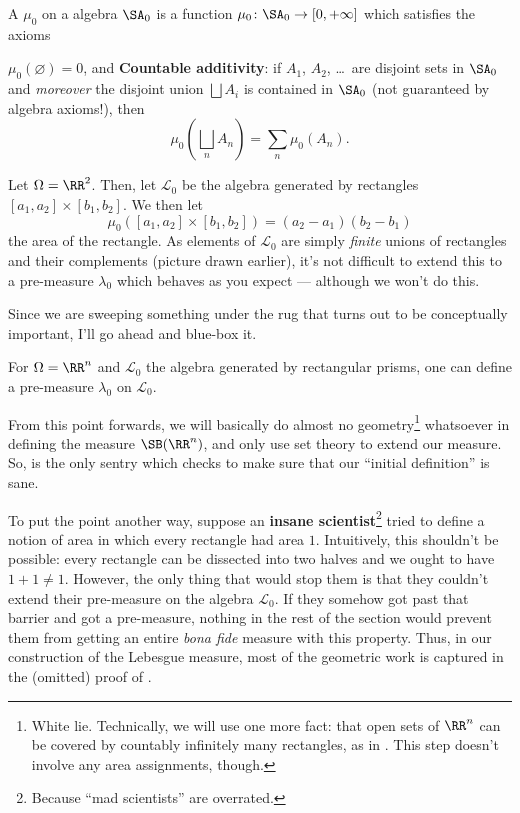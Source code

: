 \begin{definition}
	A  $\mu_0$ on a algebra $\SA_0$
	is a function $\mu_0 \colon \SA_0 \to [0, +\infty]$
	which satisfies the axioms
	\begin{itemize}
		\ii $\mu_0(\varnothing) = 0$, and
		\ii \textbf{Countable additivity}:
		if $A_1$, $A_2$, \dots\ are disjoint sets in $\SA_0$
		and \emph{moreover} the disjoint union $\bigsqcup A_i$
		is contained in $\SA_0$ (not guaranteed by algebra axioms!),
		then
		\[ \mu_0\left( \bigsqcup_n A_n \right) = \sum_n \mu_0(A_n). \]
	\end{itemize}
\end{definition}

\begin{example}
	Let $\Omega = \RR^2$.
	Then, let $\mathcal{L}_0$ be the algebra generated by rectangles
	$[a_1, a_2] \times [b_1, b_2]$.
	We then let
	\[ \mu_0\left( [a_1, a_2] \times [b_1, b_2] \right)
	= (a_2-a_1)(b_2-b_1) \]
	the area of the rectangle.
	As elements of $\mathcal{L}_0$ are simply \emph{finite} unions
	of rectangles and their complements (picture drawn earlier),
	it's not difficult to extend this to a pre-measure $\lambda_0$
	which behaves as you expect --- although we won't do this.
\end{example}

Since we are sweeping something under the rug that
turns out to be conceptually important,
I'll go ahead and blue-box it.
\begin{proposition}
	\label{prop:lebesgue_rectangle}
	For $\Omega = \RR^n$ and $\mathcal{L}_0$
	the algebra generated by rectangular prisms,
	one can define a pre-measure $\lambda_0$ on $\mathcal{L}_0$.
\end{proposition}
From this point forwards, we will basically do
almost no geometry\footnote{White lie.
	Technically, we will use one more fact:
	that open sets of $\RR^n$ can be covered by countably
	infinitely many rectangles,
	as in .
	This step doesn't involve any area assignments, though.}
whatsoever in defining the measure $\SB(\RR^n)$,
and only use set theory to extend our measure.
So,  is the only sentry
which checks to make sure that our ``initial definition'' is sane.

To put the point another way,
suppose an \textbf{insane scientist}\footnote{Because
	``mad scientists'' are overrated.}
tried to define a notion
of area in which every rectangle had area $1$.
Intuitively, this shouldn't be possible:
every rectangle can be dissected into two halves
and we ought to have $1+1 \neq 1$.
However, the only thing that would stop them is that they couldn't
extend their pre-measure on the algebra $\mathcal{L}_0$.
If they somehow got past that barrier and got a pre-measure,
nothing in the rest of the section would prevent them
from getting an entire \emph{bona fide} measure with this property.
Thus, in our construction of the Lebesgue measure,
most of the geometric work is captured in the (omitted) proof
of .

